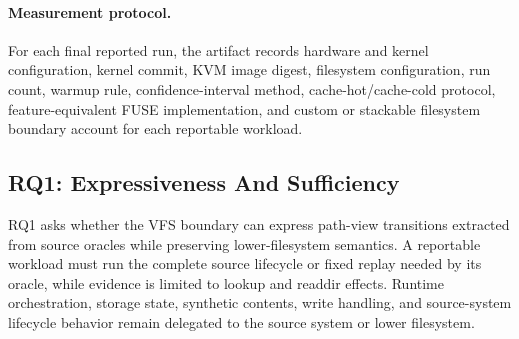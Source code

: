 \paragraph{Measurement protocol.}
For each final reported run, the artifact records hardware and kernel
configuration, kernel commit, KVM image digest, filesystem configuration, run
count, warmup rule, confidence-interval method, cache-hot/cache-cold protocol,
feature-equivalent FUSE implementation, and custom or stackable filesystem
boundary account for each reportable workload.

\subsection{RQ1: Expressiveness And Sufficiency}

RQ1 asks whether the VFS boundary can express path-view transitions extracted
from source oracles while preserving lower-filesystem semantics. A reportable
workload must run the complete source lifecycle or fixed replay needed by its
oracle, while \namei evidence is limited to lookup and readdir effects.
Runtime orchestration, storage state, synthetic contents, write handling, and
source-system lifecycle behavior remain delegated to the source system or
lower filesystem.

